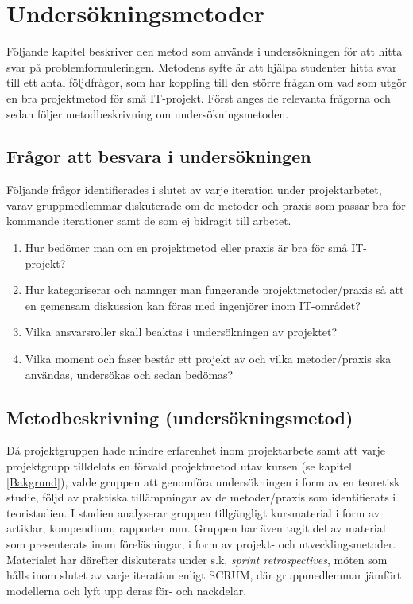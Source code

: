 \documentclass[conference]{IEEEtran}
\begin{document}
\section{Undersökningsmetoder}
Följande kapitel beskriver den metod som används i undersökningen för att hitta svar på problemformuleringen.
Metodens syfte är att hjälpa studenter hitta svar till ett antal följdfrågor, som har koppling till den större 
frågan om vad som utgör en bra projektmetod för små IT-projekt. Först anges de relevanta frågorna och sedan 
följer metodbeskrivning om undersökningsmetoden. 

\subsection{Frågor att besvara i undersökningen}
Följande frågor identifierades i slutet av varje iteration under projektarbetet, varav gruppmedlemmar diskuterade
om de metoder och praxis som passar bra för kommande iterationer samt de som ej bidragit till arbetet.
\begin{enumerate}
    \item Hur bedömer man om en projektmetod eller praxis är bra för små IT-projekt?
    \item Hur kategoriserar och namnger man 
    fungerande projektmetoder/praxis så att en gemensam diskussion kan föras med ingenjörer inom IT-området?
    \item Vilka ansvarsroller skall beaktas i undersökningen av projektet?
    \item Vilka moment och faser består ett projekt av och vilka metoder/praxis ska användas,
    undersökas och sedan bedömas?
\end{enumerate}

\subsection{Metodbeskrivning (undersökningsmetod)}\label{metodbeskr}
Då projektgruppen hade mindre erfarenhet inom projektarbete samt att varje projektgrupp tilldelats en förvald projektmetod utav kursen (se kapitel \ref{Bakgrund}), 
valde gruppen att genomföra undersökningen i form av en teoretisk studie, följd av praktiska tillämpningar av de metoder/praxis som identifierats 
i teoristudien. I studien analyserar gruppen tillgängligt kursmaterial i form av artiklar, kompendium, rapporter mm. Gruppen har även tagit del av 
material som presenterats inom föreläsningar, i form av projekt- och utvecklingsmetoder. Materialet har därefter diskuterats under s.k. \textit{sprint retrospectives}, 
möten som hålls inom slutet av varje iteration enligt SCRUM, där gruppmedlemmar jämfört modellerna och lyft upp deras för- och nackdelar.
\end{document}
